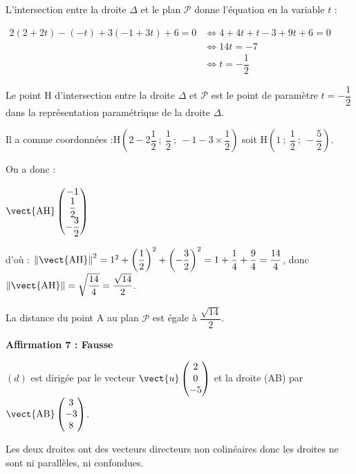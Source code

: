 L'intersection entre la droite $\Delta$ et le plan $\mathcal{P}$ donne l'équation en la variable $t$ :

$\begin{aligned} 2(2+2t)- (-t)+3(-1+3t)+6=0 &\iff 4+4t+t-3+9t+6=0\\
	& \iff 14t=-7\\
	& \iff t=-\dfrac{1}{2}
\end{aligned}$

Le point H d'intersection entre la droite $\Delta$ et $\mathcal{P}$ est le point de paramètre  $ t=-\dfrac{1}{2}$ dans la représentation paramétrique de la droite $\Delta$.

Il a comme coordonnées :\quad$\mathrm{H}\left(2 -2 \dfrac{1}{2}~;~\dfrac{1}{2}~;~-1 - 3 \times\dfrac{1}{2}\right)$ soit $\mathrm{H}\left(1~;~\dfrac{1}{2}~;~-\dfrac{5}{2}\right)$.

On a donc :

$\vect{\mathrm{AH}}\begin{pmatrix}-1\\ \dfrac{1}{2}\\ -\dfrac{3}{2}\end{pmatrix}$

d'où : $\left\|\vect {\mathrm{AH}}\right\|^2=1^2+ \left(\dfrac{1}{2}\right)^2+\left(-\dfrac{3}{2}\right)^2=1+\dfrac{1}{4}+\dfrac{9}{4}=\dfrac{14}{4}$, donc $\left\|\vect {\mathrm{AH}}\right\|=\sqrt{\dfrac{14}{4}}=\dfrac{\sqrt{14}}{2}$.

La distance du point A au plan $\mathcal{P}$ est égale à $\dfrac{\sqrt{14}}{2}$.

\smallskip









\textbf{Affirmation 7 : Fausse}

$(d)$ est dirigée par le vecteur $\vect{u}\begin{pmatrix}2\\0\\-5\end{pmatrix}$ et la droite (AB) par $\vect{\mathrm{AB}}\begin{pmatrix}3 \\ -3\\8\end{pmatrix}$.

Les deux droites ont des vecteurs directeurs non colinéaires  donc les droites ne sont ni parallèles, ni confondues.

